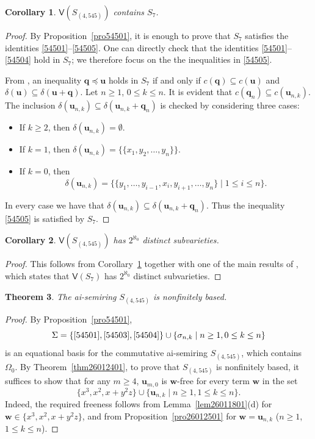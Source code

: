 \documentclass[reqno]{amsart}
\theoremstyle{plain}
\newtheorem{thm}{Theorem}[section]
\newtheorem{cor}[thm]{Corollary}
\theoremstyle{definition}
\newcommand{\bq}{\mathbf{q}}
\newcommand{\bu}{\mathbf{u}}
\newcommand{\bw}{\mathbf{w}}
\begin{document}
\begin{cor}\label{pro01}
$\mathsf{V}(S_{(4, 545)})$ contains $S_7$.
\end{cor}
\begin{proof}
By Proposition~\ref{pro54501},
it is enough to prove that $S_7$ satisfies the identities \eqref{54501}--\eqref{54505}.
One can directly check that the identities \eqref{54501}--\eqref{54504} hold in $S_7$;
we therefore focus on the the inequalities in \eqref{54505}.

From \cite[Proposition 5.5]{gmrz},
an inequality $\bq\preceq\bu$ holds in $S_7$
if and only if $c(\bq)\subseteq c(\bu)$ and $\delta(\bu)\subseteq\delta(\bu+\bq)$.
Let $n \geq 1$, $0\leq k\leq n$.
It is evident that $c(\bq_n)\subseteq c(\bu_{n,k})$.
The inclusion $\delta(\bu_{n,k})\subseteq\delta(\bu_{n,k}+\bq_n)$ is checked by considering three cases:
\begin{itemize}
\item If $k\geq 2$, then $\delta(\bu_{n,k})=\emptyset$.

\item If $k=1$, then
$
\delta(\bu_{n,k})=\{\{x_1, y_{2}, \ldots, y_n\}\}.
$

\item If $k=0$, then
\[
\delta(\bu_{n,k})=\{\{y_1, \ldots, y_{i-1}, x_i, y_{i+1},\ldots, y_n\}\mid 1\leq i \leq n\}.
\]
\end{itemize}
In every case we have that $\delta(\bu_{n,k})\subseteq\delta(\bu_{n,k}+\bq_n)$.
Thus the inequality \eqref{54505} is satisfied by $S_7$.
\end{proof}

\begin{cor}\label{coro01}
$\mathsf{V}(S_{(4, 545)})$ has $2^{\aleph_0}$ distinct subvarieties.
\end{cor}
\begin{proof}
This follows from Corollary~\ref{pro01} together with one of the main results of \cite{gmrz},
which states that $\mathsf{V}(S_7)$ has $2^{\aleph_0}$ distinct subvarieties.
\end{proof}

\begin{thm}\label{thm545}
The ai-semiring $S_{(4, 545)}$ is nonfinitely based.
\end{thm}
\begin{proof}
By Proposition~\ref{pro54501},
\[
\Sigma=\{\eqref{54501}, \eqref{54503}, \eqref{54504}\}\cup\{\sigma_{n, k} \mid n\geq 1, 0\leq k\leq n\}
\]
is an equational basis for the commutative ai-semiring $S_{(4, 545)}$, which contains $\Omega_0$.
By Theorem~\ref{thm26012401}, to prove that $S_{(4, 545)}$ is nonfinitely based,
it suffices to show that for any $m\geq 4$, $\bu_{m, 0}$ is $\bw$-free for every term $\bw$ in the set
\[\{x^3, x^2, x+y^2z\}\cup\{\bu_{n, k}\mid n\geq 1, 1\leq k\leq n\}.
\]
Indeed, the required freeness follows from Lemma~\ref{lem26011801}(d) for $\mathbf{w}\in\{x^3,x^2,x+y^2z\}$,
and from Proposition~\ref{pro26012501} for $\mathbf{w}=\mathbf{u}_{n,k}$ ($n\geq1$, $1\leq k\leq n$).
\end{proof}
\end{document}
